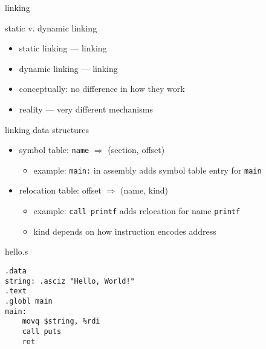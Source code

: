 
\begin{frame}{linking}
\end{frame}

\begin{frame}{static v. dynamic linking}
    \begin{itemize}
    \item static linking --- linking 
    \item dynamic linking --- linking 
    \vspace{.5cm}
    \item<2> conceptually: no difference in how they work
    \item<2> reality --- very different mechanisms
    \end{itemize}
\end{frame}

\begin{frame}{linking data structures}
    \begin{itemize}
    \item symbol table: {\tt name} $\Rightarrow$ (section, offset)
        \begin{itemize}
        \item example: {\tt main:} in assembly adds symbol table entry for {\tt main}
        \end{itemize}
    \item relocation table: offset $\Rightarrow$ (name, kind)
        \begin{itemize}
        \item example: {\tt call printf} adds relocation for name {\tt printf}
        \item kind depends on how instruction encodes address
        \end{itemize}
    \end{itemize}
\end{frame}

\begin{frame}[fragile,label=linkingExAsm]{hello.s}
\begin{lstlisting}
.data
string: .asciz "Hello, World!"
.text
.globl main
main:
    movq $string, %rdi
    call puts
    ret
\end{lstlisting}
\end{frame}

